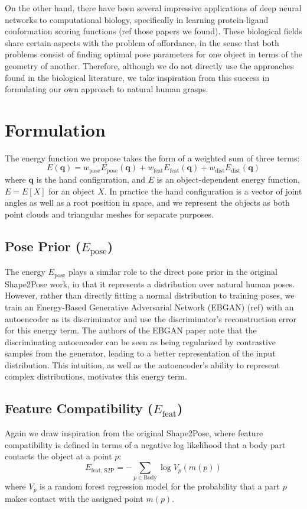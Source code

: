 \documentclass[10pt,twocolumn,letterpaper]{article}
\def\q{\mathbf{q}}
\begin{document}
On the other hand, there have been several impressive applications of deep neural networks to computational biology, specifically in learning protein-ligand conformation scoring functions (ref those papers we found). These biological fields share certain aspects with the problem of affordance, in the sense that both problems consist of finding optimal pose parameters for one object in terms of the geometry of another. Therefore, although we do not directly use the approaches found in the biological literature, we take inspiration from this success in formulating our own approach to natural human grasps.

\section{Formulation}
The energy function we propose takes the form of a weighted sum of three terms:
\begin{equation}
E(\q) = w_{\text{pose}}E_{\text{pose}}(\q) + w_{\text{feat}}E_{\text{feat}}(\q)+ w_{\text{dist}}E_{\text{dist}}(\q)
\end{equation}
where $\q$ is the hand configuration, and $E$ is an object-dependent energy function, $E = E[X]$ for an object $X$. In practice the hand configuration is a vector of joint angles as well as a root position in space, and we represent the objects as both point clouds and triangular meshes for separate purposes.

\subsection{Pose Prior ($E_{\text{pose}}$)}
The energy $E_{\text{pose}}$ plays a similar role to the direct pose prior in the original Shape2Pose work, in that it represents a distribution over natural human poses. However, rather than directly fitting a normal distribution to training poses, we train an Energy-Based Generative Adversarial Network (EBGAN) (ref) with an autoencoder as its discriminator and use the discriminator's reconstruction error for this energy term. The authors of the EBGAN paper note that the discriminating autoencoder can be seen as being regularized by contrastive samples from the generator, leading to a better representation of the input distribution. This intuition, as well as the autoencoder's ability to represent complex distributions, motivates this energy term.

\subsection{Feature Compatibility ($E_{\text{feat}}$)}
Again we draw inspiration from the original Shape2Pose, where feature compatibility is defined in terms of a negative log likelihood that a body part contacts the object at a point $p$:
\begin{equation}
	E_{\text{feat, S2P}} = -\sum_{p \in \text{Body}} \log V_p(m(p))
\end{equation}
where $V_p$ is a random forest regression model for the probability that a part $p$ makes contact with the assigned point $m(p)$.
\end{document}
